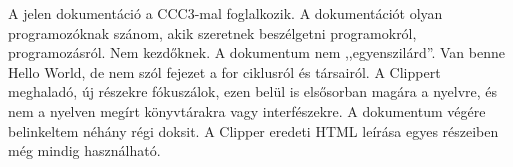 A jelen dokumentáció a CCC3-mal foglalkozik.
A dokumentációt olyan programozóknak szánom, akik szeretnek beszélgetni
programokról, programozásról. Nem kezdőknek. A dokumentum nem ,,egyenszilárd''.
Van benne Hello World, de nem szól fejezet a for ciklusról és társairól.
A Clippert meghaladó, új részekre fókuszálok,
ezen belül is elsősorban magára a nyelvre, 
és nem a nyelven megírt könyvtárakra vagy interfészekre.
A dokumentum végére belinkeltem néhány régi doksit.
A Clipper eredeti HTML leírása egyes részeiben még mindig használható.





